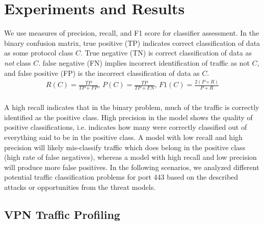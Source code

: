\section{Experiments and Results}

We use measures of precision, recall, and F1 score for classifier assessment. In the binary confusion matrix, true positive (TP) indicates correct classification of data as some protocol class $C$. True negative (TN) is correct classification of data as \textit{not} class $C$. false negative (FN) implies incorrect identification of traffic as not $C$, and false positive (FP) is the incorrect classification of data as $C$.
\begin{equation}
\begin{split}
    R(C) = \frac{TP}{TP + FP} \text{,  }
    P(C) = \frac{TP}{TP + FN} \text{,  }
    F1(C) = \frac{2(P\times R)}{P + R} \\
    \end{split}
\end{equation}

A high recall indicates that in the binary problem, much of the traffic is correctly identified as the positive class. High precision in the model shows the quality of positive classifications, i.e. indicates how many were correctly classified out of everything said to be in the positive class. A model with low recall and high precision will likely mis-classify traffic which does belong in the positive class (high rate of false negatives), whereas a model with high recall and low precision will produce more false positives. In the following scenarios, we analyzed different potential traffic classification problems for port 443 based on the described attacks or opportunities from the threat models.

\subsection{VPN Traffic Profiling}

